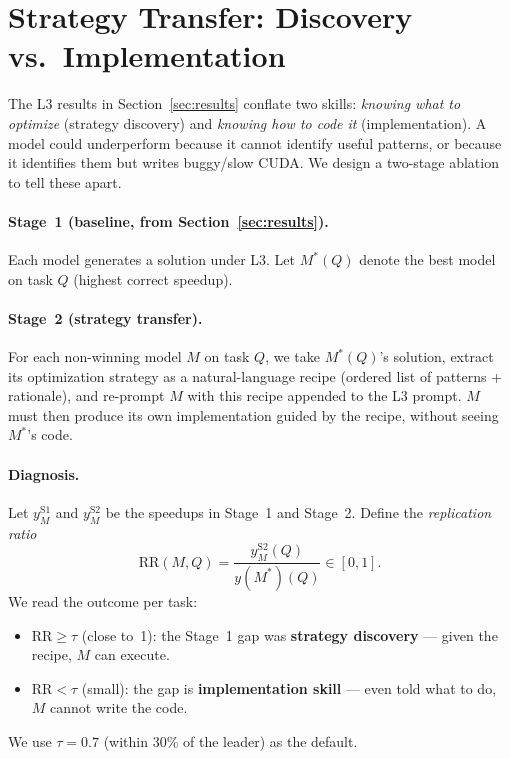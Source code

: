 \documentclass{article}
\begin{document}
\section{Strategy Transfer: Discovery vs.\ Implementation}
\label{sec:transfer}

The L3 results in Section~\ref{sec:results} conflate two skills:
\emph{knowing what to optimize} (strategy discovery) and
\emph{knowing how to code it} (implementation). A model could
underperform because it cannot identify useful patterns, or because
it identifies them but writes buggy/slow CUDA. We design a two-stage
ablation to tell these apart.

\paragraph{Stage~1 (baseline, from Section~\ref{sec:results}).}
Each model generates a solution under L3. Let $M^{*}(Q)$ denote the
best model on task $Q$ (highest correct speedup).

\paragraph{Stage~2 (strategy transfer).}
For each non-winning model $M$ on task $Q$, we take $M^{*}(Q)$'s
solution, extract its optimization strategy as a natural-language
recipe (ordered list of patterns + rationale), and re-prompt $M$ with
this recipe appended to the L3 prompt. $M$ must then produce its own
implementation guided by the recipe, without seeing $M^{*}$'s code.

\paragraph{Diagnosis.} Let $y^{\mathrm{S1}}_{M}$ and
$y^{\mathrm{S2}}_{M}$ be the speedups in Stage~1 and Stage~2. Define
the \emph{replication ratio}
\begin{equation}
\mathrm{RR}(M, Q) = \frac{y^{\mathrm{S2}}_{M}(Q)}{y(M^*)(Q)}
  \in [0, 1].
\label{eq:rr}
\end{equation}
We read the outcome per task:
\begin{itemize}
  \item $\mathrm{RR} \geq \tau$ (close to~1): the Stage~1 gap was
        \textbf{strategy discovery} --- given the recipe, $M$ can
        execute.
  \item $\mathrm{RR} < \tau$ (small): the gap is \textbf{implementation
        skill} --- even told what to do, $M$ cannot write the code.
\end{itemize}
We use $\tau = 0.7$ (within $30\%$ of the leader) as the default.
\end{document}
